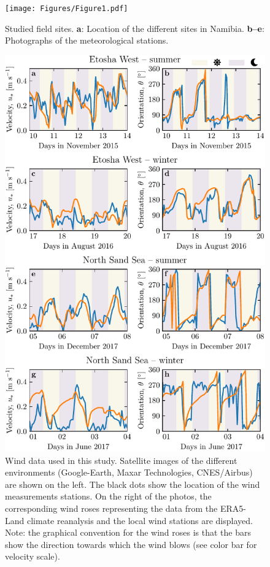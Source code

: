 \begin{figure}[t]
  \centering
  \texttt{[image: Figures/Figure1.pdf]}
  \caption{Studied field sites. \textbf{a}: Location of the different sites in Namibia. \textbf{b--e}: Photographs of the meteorological stations.}
  \label{Fig1}
\end{figure}

\begin{figure}[t]
\centering
\includegraphics[scale=1]{Figures/Figure2.pdf}
\caption{Wind data used in this study. Satellite images of the different environments (Google-Earth, Maxar Technologies, CNES/Airbus) are shown on the left. The black dots show the location of the wind measurements stations. On the right of the photos, the corresponding wind roses representing the data from the ERA5-Land climate reanalysis and the local wind stations are displayed. Note: the graphical convention for the wind roses is that the bars show the direction towards which the wind blows (see color bar for velocity scale).}
\label{Fig2}
\end{figure}


